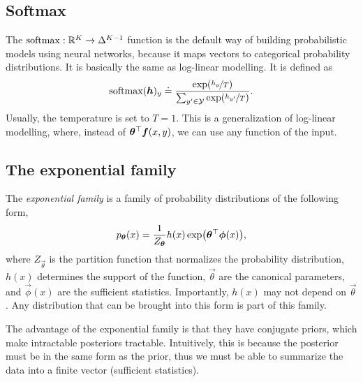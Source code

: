 \subsection{Softmax}


The $\mathrm{softmax}: \mathbb{R}^K \to \Delta^{K-1}$ function is the default way of building
probabilistic models using neural networks, because it maps vectors to
categorical probability distributions. It is basically the same as log-linear
modelling. It is defined as \[
  \softmax(\vec{h})_y \doteq \frac{\exp \lft( \nicefrac{h_y}{T} \rgt)}{\sum_{y'\in\mathcal{Y}} \exp \lft( \nicefrac{h_{y'}}{T} \rgt)}
.\]
Usually, the temperature is set to $T=1$. This is a generalization of
log-linear modelling, where, instead of $\bm{\theta}^\top
\bm{f}(x,y)$, we can use any function of the input.

\subsection{The exponential family}

The \textit{exponential family} is a family of probability distributions of the
following form, \[
  p_{\vec{\theta}}(x) = \frac{1}{Z_{\vec{\theta}}} h(x) \exp \lft( \transpose{\vec{\theta}} \vec{\phi}(x) \rgt)
,\]
where $Z_{\vec{\theta}}$ is the partition function that normalizes the
probability distribution, $h(x)$ determines the support of the function,
$\vec{\theta}$ are the canonical parameters, and $\vec{\phi}(x)$ are the
sufficient statistics. Importantly, $h(x)$ may not depend on $\vec{\theta}$.
Any distribution that can be brought into this form is part of this
family.

The advantage of the exponential family is that they have conjugate priors,
which make intractable posteriors tractable. Intuitively, this is because the
posterior must be in the same form as the prior, thus we must be able to
summarize the data into a finite vector (sufficient statistics).
